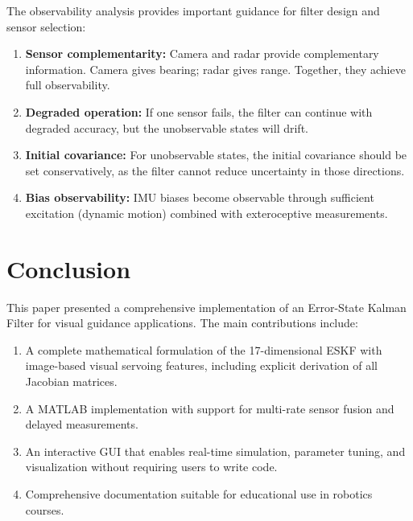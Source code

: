 \documentclass[11pt,a4paper]{article}
\begin{document}
The observability analysis provides important guidance for filter design and sensor selection:
\begin{enumerate}
    \item \textbf{Sensor complementarity:} Camera and radar provide complementary information. Camera gives bearing; radar gives range. Together, they achieve full observability.
    \item \textbf{Degraded operation:} If one sensor fails, the filter can continue with degraded accuracy, but the unobservable states will drift.
    \item \textbf{Initial covariance:} For unobservable states, the initial covariance should be set conservatively, as the filter cannot reduce uncertainty in those directions.
    \item \textbf{Bias observability:} IMU biases become observable through sufficient excitation (dynamic motion) combined with exteroceptive measurements.
\end{enumerate}

\section{Conclusion}
\label{sec:conclusion}

This paper presented a comprehensive implementation of an Error-State Kalman Filter for visual guidance applications. The main contributions include:

\begin{enumerate}
    \item A complete mathematical formulation of the 17-dimensional ESKF with image-based visual servoing features, including explicit derivation of all Jacobian matrices.
    
    \item A MATLAB implementation with support for multi-rate sensor fusion and delayed measurements.
    
    \item An interactive GUI that enables real-time simulation, parameter tuning, and visualization without requiring users to write code.
    
    \item Comprehensive documentation suitable for educational use in robotics courses.
\end{enumerate}
\end{document}
